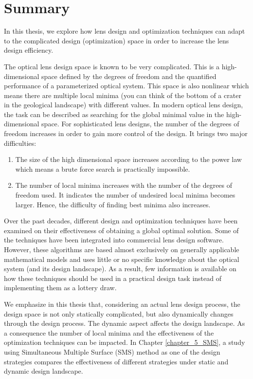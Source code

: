 \chapter*{Summary}

In this thesis, we explore how lens design and optimization techniques can adapt to the complicated design (optimization) space in order to increase the lens design efficiency. 

The optical lens design space is known to be very complicated. This is a high-dimensional space defined by the degrees of freedom and the quantified performance of a parameterized optical system. This space is also nonlinear which means there are multiple local minima (you can think of the bottom of a crater in the geological landscape) with different values. In modern optical lens design, the task can be described as searching for the global minimal value in the high-dimensional space. For sophisticated lens designs, the number of the degrees of freedom increases in order to gain more control of the design. It brings two major difficulties:  
\begin{enumerate}[nosep]
\item The size of the high dimensional space increases according to the power law which means a brute force search is practically impossible. 
\item The number of local minima increases with the number of the degrees of freedom used. It indicates the number of undesired local minima becomes larger. Hence, the difficulty of finding best minima also increases.  


\end{enumerate}

Over the past decades, different design and optimization techniques have been examined on their effectiveness of obtaining a global optimal solution. Some of the techniques have been integrated into commercial lens design software. However, these algorithms are based almost exclusively on generally applicable mathematical models and uses little or no specific knowledge about the optical system (and its design landscape). As a result, few information is available on how these techniques should be used in a practical design task instead of implementing them as a lottery draw. 

We emphasize in this thesis that, considering an actual lens design process, the design space is not only statically complicated, but also dynamically changes through the design process. The dynamic aspect affects the design landscape. As a consequence the number of local minima and the effectiveness of the optimization techniques can be impacted. In Chapter \ref{chapter_5_SMS}, a study using Simultaneous Multiple Surface (SMS) method as one of the design strategies compares the effectiveness of different strategies under static and dynamic design landscape.


